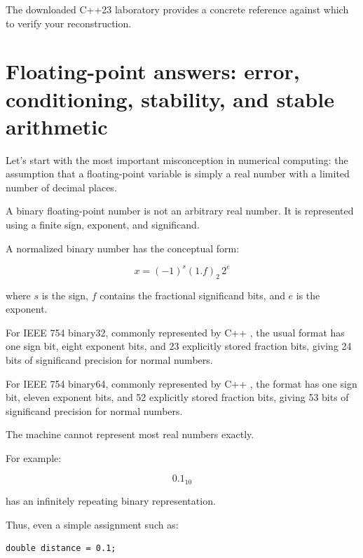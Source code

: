 The downloaded C++23 laboratory provides a concrete reference against which to verify your reconstruction.

\section{Floating-point answers: error, conditioning, stability, and stable arithmetic}\label{02-foundations-ii-ch028-floating-point-answers-error-conditioning-stability-and-stable-arithmetic}

\hypertarget{02-foundations-ii-ch028-floating-point-answers-error-conditioning-stability-and-stable-arithmetic}{}


Let's start with the most important misconception in numerical computing: the assumption that a floating-point variable is simply a real number with a limited number of decimal places.

A binary floating-point number is not an arbitrary real number. It is represented using a finite sign, exponent, and significand.

A normalized binary number has the conceptual form:

\[ \boxed{x=(-1)^s(1.f)_2\,2^e} \]

where \(s\) is the sign, \(f\) contains the fractional significand bits, and \(e\) is the exponent.

For IEEE 754 binary32, commonly represented by C++ , the usual format has one sign bit, eight exponent bits, and 23 explicitly stored fraction bits, giving 24 bits of significand precision for normal numbers.

For IEEE 754 binary64, commonly represented by C++ , the format has one sign bit, eleven exponent bits, and 52 explicitly stored fraction bits, giving 53 bits of significand precision for normal numbers.

The machine cannot represent most real numbers exactly.

For example:

\[ 0.1_{10} \]

has an infinitely repeating binary representation.

Thus, even a simple assignment such as:

\begin{verbatim}
double distance = 0.1;
\end{verbatim}

